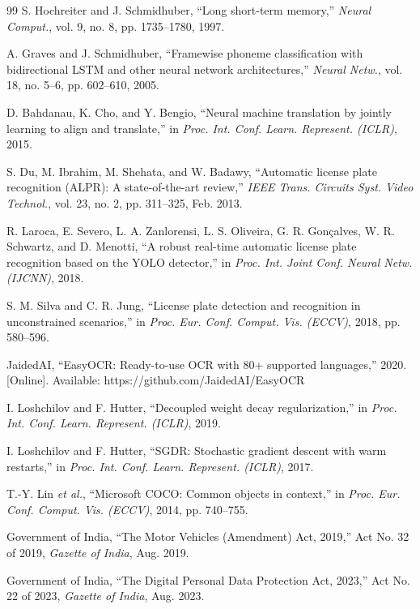 \documentclass[conference]{IEEEtran}
\begin{document}
\begin{thebibliography}{99}
S. Hochreiter and J. Schmidhuber, ``Long short-term memory,'' \emph{Neural Comput.}, vol. 9, no. 8, pp. 1735--1780, 1997.

A. Graves and J. Schmidhuber, ``Framewise phoneme classification with bidirectional LSTM and other neural network architectures,'' \emph{Neural Netw.}, vol. 18, no. 5--6, pp. 602--610, 2005.

D. Bahdanau, K. Cho, and Y. Bengio, ``Neural machine translation by jointly learning to align and translate,'' in \emph{Proc. Int. Conf. Learn. Represent. (ICLR)}, 2015.

S. Du, M. Ibrahim, M. Shehata, and W. Badawy, ``Automatic license plate recognition (ALPR): A state-of-the-art review,'' \emph{IEEE Trans. Circuits Syst. Video Technol.}, vol. 23, no. 2, pp. 311--325, Feb. 2013.

R. Laroca, E. Severo, L. A. Zanlorensi, L. S. Oliveira, G. R. Gon\c{c}alves, W. R. Schwartz, and D. Menotti, ``A robust real-time automatic license plate recognition based on the YOLO detector,'' in \emph{Proc. Int. Joint Conf. Neural Netw. (IJCNN)}, 2018.

S. M. Silva and C. R. Jung, ``License plate detection and recognition in unconstrained scenarios,'' in \emph{Proc. Eur. Conf. Comput. Vis. (ECCV)}, 2018, pp. 580--596.

JaidedAI, ``EasyOCR: Ready-to-use OCR with 80+ supported languages,'' 2020. [Online]. Available: https://github.com/JaidedAI/EasyOCR

I. Loshchilov and F. Hutter, ``Decoupled weight decay regularization,'' in \emph{Proc. Int. Conf. Learn. Represent. (ICLR)}, 2019.

I. Loshchilov and F. Hutter, ``SGDR: Stochastic gradient descent with warm restarts,'' in \emph{Proc. Int. Conf. Learn. Represent. (ICLR)}, 2017.

T.-Y. Lin \emph{et al.}, ``Microsoft COCO: Common objects in context,'' in \emph{Proc. Eur. Conf. Comput. Vis. (ECCV)}, 2014, pp. 740--755.

Government of India, ``The Motor Vehicles (Amendment) Act, 2019,'' Act No. 32 of 2019, \emph{Gazette of India}, Aug. 2019.

Government of India, ``The Digital Personal Data Protection Act, 2023,'' Act No. 22 of 2023, \emph{Gazette of India}, Aug. 2023.

\end{thebibliography}
\end{document}
